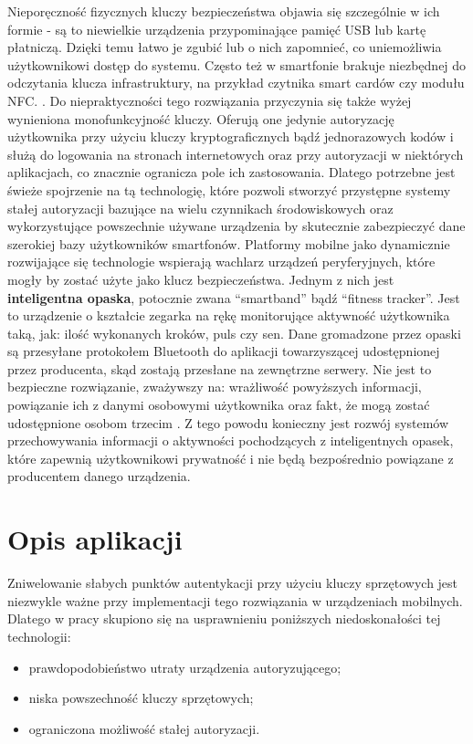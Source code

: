 \indent Nieporęczność fizycznych kluczy bezpieczeństwa objawia się szczególnie w ich formie - są to niewielkie urządzenia przypominające pamięć USB
lub kartę płatniczą. Dzięki temu łatwo je zgubić lub o nich zapomnieć, co uniemożliwia użytkownikowi dostęp do systemu. Często też w smartfonie
brakuje niezbędnej do odczytania klucza infrastruktury, na przykład czytnika smart cardów czy modułu NFC. \cite{Usability-Two-Factor}.
Do niepraktyczności tego rozwiązania przyczynia się także wyżej wynieniona monofunkcyjność kluczy. Oferują one jedynie autoryzację użytkownika przy
użyciu kluczy kryptograficznych bądź jednorazowych kodów i służą do logowania na stronach internetowych oraz przy autoryzacji w niektórych aplikacjach,
co znacznie ogranicza pole ich zastosowania. Dlatego potrzebne jest świeże spojrzenie na tą technologię, które pozwoli stworzyć
przystępne systemy stałej autoryzacji bazujące na wielu czynnikach środowiskowych oraz wykorzystujące powszechnie używane urządzenia
by skutecznie zabezpieczyć dane szerokiej bazy użytkowników smartfonów.
\newline\newline
\indent Platformy mobilne jako dynamicznie rozwijające się technologie wspierają wachlarz urządzeń peryferyjnych, które mogły by zostać użyte jako klucz
bezpieczeństwa. Jednym z nich jest \textbf{inteligentna opaska}, potocznie zwana ``smartband'' bądź ``fitness tracker''. Jest to urządzenie o
kształcie zegarka na rękę monitorujące aktywność użytkownika taką, jak: ilość wykonanych kroków, puls czy sen. Dane gromadzone przez opaski są
przesyłane protokołem Bluetooth do aplikacji towarzyszącej udostępnionej przez producenta, skąd zostają przesłane na zewnętrzne serwery. Nie
jest to bezpieczne rozwiązanie, zważywszy na: wrażliwość powyższych informacji, powiązanie ich z danymi osobowymi użytkownika oraz fakt,
że mogą zostać udostępnione osobom trzecim \cite{Fitness-Tracker-Security}. Z tego powodu konieczny jest rozwój systemów przechowywania informacji o aktywności pochodzących z
inteligentnych opasek, które zapewnią użytkownikowi prywatność i nie będą bezpośrednio powiązane z producentem danego urządzenia.

\section{Opis aplikacji}
Zniwelowanie słabych punktów autentykacji przy użyciu kluczy sprzętowych jest niezwykle ważne przy implementacji tego rozwiązania w urządzeniach
mobilnych. Dlatego w pracy skupiono się na usprawnieniu poniższych niedoskonałości tej technologii:
\begin{itemize}
    \item prawdopodobieństwo utraty urządzenia autoryzującego;
    \item niska powszechność kluczy sprzętowych;
    \item ograniczona możliwość stałej autoryzacji.
\end{itemize}

